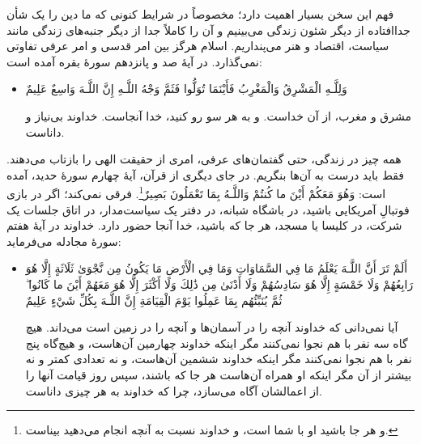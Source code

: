 فهم این سخن بسیار اهمیت دارد؛ مخصوصاً در شرایط کنونی که ما دین را یک شأن جداافتاده از دیگر شئون زندگی می‌بینیم و آن را کاملاً جدا از دیگر جنبه‌های زندگی مانند سیاست، اقتصاد و هنر می‌پنداریم. اسلام هرگز بین امر قدسی و امر عرفی تفاوتی نمی‌گذارد. در آیهٔ صد و پانزدهم سورهٔ بقره آمده است: 

\begin{itemize}
	\item[]
	
	{
		وَلِلَّـهِ الْمَشْرِقُ وَالْمَغْرِبُ  فَأَيْنَمَا تُوَلُّوا فَثَمَّ وَجْهُ اللَّـهِ  إِنَّ اللَّـهَ وَاسِعٌ عَلِيمٌ
	}
	
	{
		مشرق و مغرب، از آن خداست. و به هر سو رو کنید، خدا آنجاست. خداوند بی‌نیاز و داناست.
	}
\end{itemize}

همه چیز در زندگی، حتی گفتمان‌های عرفی، امری از حقیقت الهی را بازتاب می‌دهند. فقط باید درست به آن‌ها بنگریم. در جای دیگری از قرآن، آیهٔ چهارم سورهٔ حدید، آمده است:  { وَهُوَ مَعَكُمْ أَيْنَ ما كُنتُمْ  وَاللَّـهُ بِمَا تَعْمَلُونَ بَصِيرٌ}\footnote{و هر جا باشید او با شما است، و خداوند نسبت به آنچه انجام می‌دهید بیناست.}. فرقی نمی‌کند؛ اگر در بازی فوتبالِ آمریکایی باشید، در باشگاه شبانه، در دفتر یک سیاست‌مدار، در اتاق جلسات یک شرکت، در کلیسا یا مسجد، هر جا که باشید، خدا آنجا حضور دارد. خداوند در آیهٔ هفتم سورهٔ‌ مجادله می‌فرماید:

\begin{itemize}
	\item[]
	{
		أَلَمْ تَرَ أَنَّ اللَّـهَ يَعْلَمُ مَا فِي السَّمَاوَاتِ وَمَا فِي الْأَرْضِ مَا يَكُونُ مِن نَّجْوَىٰ ثَلَاثَةٍ إِلَّا هُوَ رَابِعُهُمْ وَلَا خَمْسَةٍ إِلَّا هُوَ سَادِسُهُمْ وَلَا أَدْنَىٰ مِن ذَٰلِكَ وَلَا أَكْثَرَ إِلَّا هُوَ مَعَهُمْ أَيْنَ ما كَانُوا ۖ ثُمَّ يُنَبِّئُهُم بِمَا عَمِلُوا يَوْمَ الْقِيَامَةِ إِنَّ اللَّـهَ بِكُلِّ شَيْءٍ عَلِيمٌ
	}
	
	{
		آیا نمی‌دانی که خداوند آنچه را در آسمان‌ها و آنچه را در زمین است می‌داند. هیچ گاه سه نفر با هم نجوا نمی‌کنند مگر اینکه خداوند چهارمین آن‌هاست، و هیچ‌گاه پنج نفر با هم نجوا نمی‌کنند مگر اینکه خداوند ششمین آن‌هاست، و نه تعدادی کمتر و نه بیشتر از آن مگر اینکه او همراه آن‌هاست هر جا که باشند، سپس روز قیامت آنها را از اعمالشان آگاه می‌سازد، چرا که خداوند به هر چیزی داناست. 
	}
\end{itemize}

